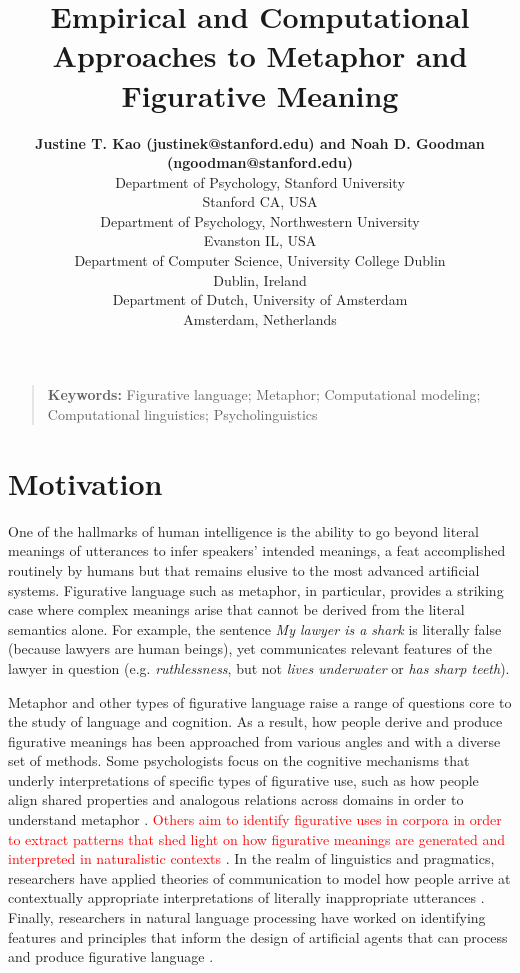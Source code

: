 \documentclass[10pt,letterpaper]{article}
\title{Empirical and Computational Approaches to Metaphor and Figurative Meaning}
\author{{\large \bf Justine T. Kao (justinek@stanford.edu) and Noah D. Goodman (ngoodman@stanford.edu)} \\ 
  Department of Psychology, 
  Stanford University \\ Stanford CA, USA 
  \AND {\large \bf Francisco Maravilla (fmaravil@gmail.com) and Dedre Gentner (gentner@northwestern.edu)} \\
  Department of Psychology, Northwestern University \\
  Evanston IL, USA
  \AND {\large \bf Tony Veale (tony.veale@ucd.ie)} \\
  Department of Computer Science, University College Dublin\\
  Dublin, Ireland
    \AND {\large \bf Gerard Steen (g.j.steen@uva.nl)} \\
  Department of Dutch, University of Amsterdam \\
Amsterdam, Netherlands
  }
\begin{document}
\maketitle

\begin{quote}
\small
\textbf{Keywords:} 
Figurative language; Metaphor; Computational modeling; Computational linguistics; Psycholinguistics
\end{quote}

\section{Motivation}
One of the hallmarks of human intelligence is the ability to go beyond literal meanings of utterances to infer speakers' intended meanings, a feat accomplished routinely by humans but that remains elusive to the most advanced artificial systems. Figurative language such as metaphor, in particular, provides a striking case where complex meanings arise that cannot be derived from the literal semantics alone. For example, the sentence \emph{My lawyer is a shark} is literally false (because lawyers are human beings), yet communicates relevant features of the lawyer in question (e.g. \emph{ruthlessness}, but not \emph{lives underwater} or \emph{has sharp teeth}). 


Metaphor and other types of figurative language raise a range of questions core to the study of language and cognition. As a result, how people derive and produce figurative meanings has been approached from various angles and with a diverse set of methods. Some psychologists focus on the cognitive mechanisms that underly interpretations of specific types of figurative use, such as how people align shared properties and analogous relations across domains in order to understand metaphor \cite{gentner1983structure, gentner2001metaphor}. 
\textcolor{red}{Others aim to identify figurative uses in corpora in order to extract patterns that shed light on how figurative meanings are generated and interpreted in naturalistic contexts \cite{steen2010method}}. In the realm of linguistics and pragmatics, researchers have applied theories of communication to model how people arrive at contextually appropriate interpretations of literally inappropriate utterances \cite{kao2014nonliteral, wilson2006metaphor, gibbs2012interpreting}. Finally, researchers in natural language processing have worked on identifying features and principles that inform the design of artificial agents that can process and produce figurative language \cite{veale2000computation, veale2007comprehending}.
\end{document}
